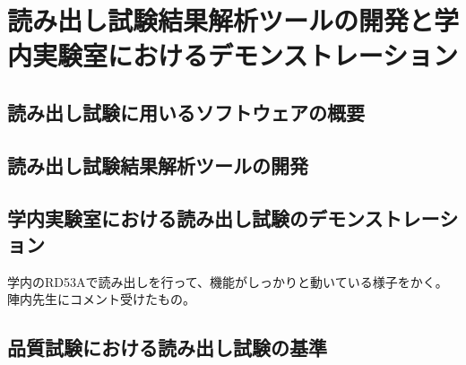 \chapter{読み出し試験結果解析ツールの開発と学内実験室におけるデモンストレーション}

\section{読み出し試験に用いるソフトウェアの概要}

\section{読み出し試験結果解析ツールの開発}

\section{学内実験室における読み出し試験のデモンストレーション}
学内のRD53Aで読み出しを行って、機能がしっかりと動いている様子をかく。陣内先生にコメント受けたもの。

\section{品質試験における読み出し試験の基準}
